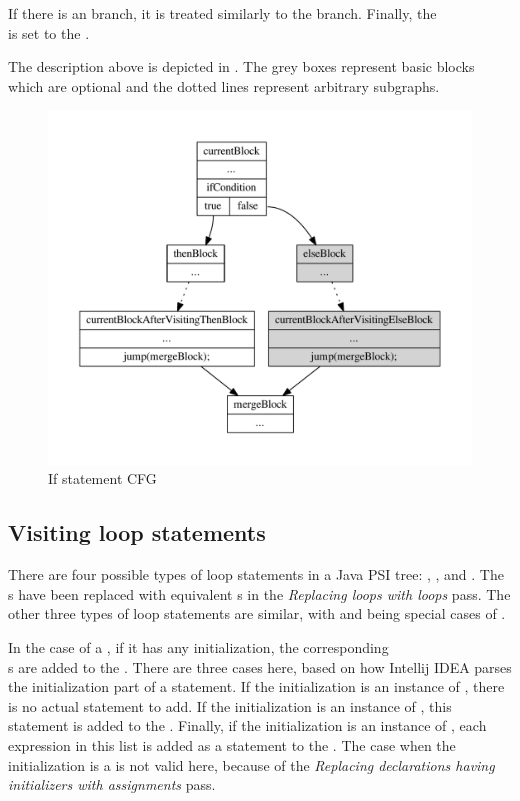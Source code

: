 If there is an  branch, it is treated similarly to the  branch. Finally, the\\
 is set to the .

The description above is depicted in . The grey boxes represent basic blocks
which are optional and the dotted lines represent arbitrary subgraphs.

\begin{figure}[htb]
    \centering
    \includegraphics[width=.5\textwidth]{src/graph/if.pdf}
    \caption{If statement CFG\label{img:if-statement}}
\end{figure}

\subsection{Visiting loop statements}

There are four possible types of loop statements in a Java PSI tree: ,
,  and . The\\
s have been replaced with equivalent s in the \textit{Replacing
 loops with  loops} pass. The other three types of loop statements are similar, with
 and  being special cases of .

In the case of a , if it has any initialization, the corresponding\\
s are added to the . There are three cases here, based on how Intellij IDEA
parses the initialization part of a  statement. If the initialization is an instance of
, there is no actual statement to add. If the initialization is an instance of
, this statement is added to the . Finally, if the initialization is
an instance of , each expression in this list is added as a statement to the
. The case when the initialization is a is not valid here, because
of the \textit{Replacing declarations having initializers with assignments} pass.

